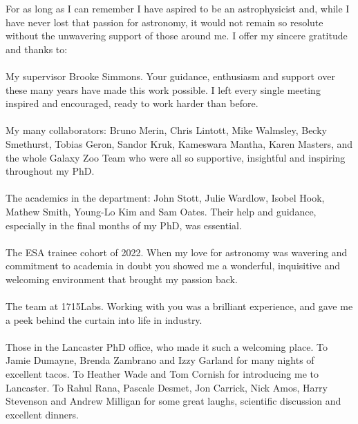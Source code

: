 

\begin{acknowledgements}      %
For as long as I can remember I have aspired to be an astrophysicist and, while I have never lost that passion for astronomy, it would not remain so resolute without the unwavering support of those around me. I offer my sincere gratitude and thanks to:
\\
\\
My supervisor Brooke Simmons. Your guidance, enthusiasm and support over these many years have made this work possible. I left every single meeting inspired and encouraged, ready to work harder than before.
\\
\\
My many collaborators: Bruno Merin, Chris Lintott, Mike Walmsley, Becky Smethurst, Tobias Geron, Sandor Kruk, Kameswara Mantha, Karen Masters, and the whole Galaxy Zoo Team who were all so supportive, insightful and inspiring throughout my PhD. 
\\
\\
The academics in the department: John Stott, Julie Wardlow, Isobel Hook, Mathew Smith, Young-Lo Kim and Sam Oates. Their help and guidance, especially in the final months of my PhD, was essential.
\\
\\
The ESA trainee cohort of 2022. When my love for astronomy was wavering and commitment to academia in doubt you showed me a wonderful, inquisitive and welcoming environment that brought my passion back.
\\
\\
The team at 1715Labs. Working with you was a brilliant experience, and gave me a peek behind the curtain into life in industry.
\\
\\
Those in the Lancaster PhD office, who made it such a welcoming place. To Jamie Dumayne, Brenda Zambrano and Izzy Garland for many nights of excellent tacos. To Heather Wade and Tom Cornish for introducing me to Lancaster. To Rahul Rana, Pascale Desmet, Jon Carrick, Nick Amos, Harry Stevenson and Andrew Milligan for some great laughs, scientific discussion and excellent dinners.
\\

\end{acknowledgements}
